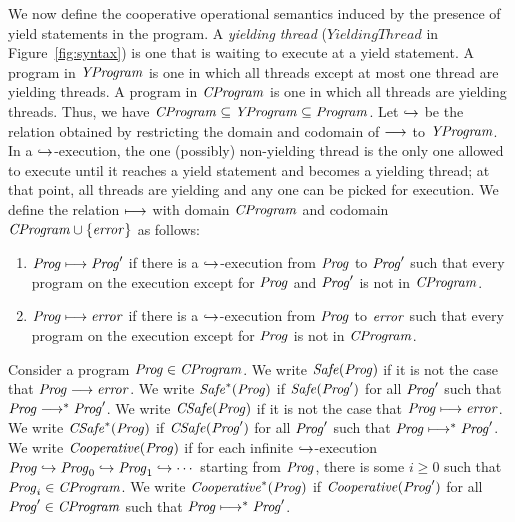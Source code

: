 We now define the cooperative operational semantics induced by the presence of yield statements in the program.
A {\em yielding thread\/} ($\mathit{YieldingThread}$ in Figure~\ref{fig:syntax}) is one that is waiting to execute at a yield statement.
A program in $\mathit{YProgram}$ is one in which all threads except at most one thread are yielding threads.
A program in $\mathit{CProgram}$ is one in which all threads are yielding threads.
Thus, we have $\mathit{CProgram} \subseteq \mathit{YProgram} \subseteq \mathit{Program}$.
Let $\hookrightarrow$ be the relation obtained by restricting the domain and codomain of $\longrightarrow$ to $\mathit{YProgram}$.
In a $\hookrightarrow$-execution, the one (possibly) non-yielding thread is the only one allowed to execute until it reaches 
a yield statement and becomes a yielding thread; at that point, all threads are yielding and any one can be picked for execution.
We define the relation $\longmapsto$ with domain $\mathit{CProgram}$ and codomain $\mathit{CProgram} \cup \{\mathit{error}\}$ as follows:
\begin{enumerate}
\item 
$\mathit{Prog} \longmapsto \mathit{Prog}'$ if there is a $\hookrightarrow$-execution from $\mathit{Prog}$ to $\mathit{Prog}'$ such that every program on the execution 
except for $\mathit{Prog}$ and $\mathit{Prog}'$ is not in $\mathit{CProgram}$.
\item
$\mathit{Prog} \longmapsto \mathit{error}$ if there is a $\hookrightarrow$-execution from $\mathit{Prog}$ to $\mathit{error}$ such that every program on the execution 
except for $\mathit{Prog}$ is not in $\mathit{CProgram}$.
\end{enumerate}

Consider a program $\mathit{Prog} \in \mathit{CProgram}$.
We write $\mathit{Safe}(\mathit{Prog})$ if it is not the case that $\mathit{Prog} \longrightarrow \mathit{error}$.
We write $\mathit{Safe}^*(\mathit{Prog})$ if $\mathit{Safe}(\mathit{Prog}')$ for all $\mathit{Prog}'$ such that $\mathit{Prog} \longrightarrow^* \mathit{Prog}'$.
We write $\mathit{CSafe}(\mathit{Prog})$ if it is not the case that $\mathit{Prog} \longmapsto \mathit{error}$.
We write $\mathit{CSafe}^*(\mathit{Prog})$ if $\mathit{CSafe}(\mathit{Prog}')$ for all $\mathit{Prog}'$ such that $\mathit{Prog} \longmapsto^* \mathit{Prog}'$.
We write $\mathit{Cooperative}(\mathit{Prog})$ if for each infinite $\hookrightarrow$-execution $\mathit{Prog} \hookrightarrow \mathit{Prog}_0 \hookrightarrow \mathit{Prog}_1 \hookrightarrow \cdots$ 
starting from $\mathit{Prog}$, there is some $i \geq 0$ such that $\mathit{Prog}_i \in \mathit{CProgram}$.
We write $\mathit{Cooperative}^*(\mathit{Prog})$ if $\mathit{Cooperative}(\mathit{Prog}')$ for all $\mathit{Prog}' \in \mathit{CProgram}$ such that $\mathit{Prog} \longmapsto^* \mathit{Prog}'$.

